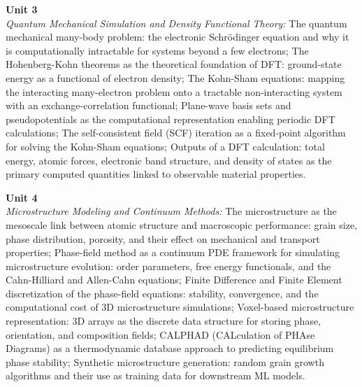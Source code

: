 \vspace{0.3cm}

\noindent\textbf{Unit 3} \\
\textit{Quantum Mechanical Simulation and Density Functional Theory:} The quantum mechanical many-body problem: the electronic Schrödinger equation and why it is computationally intractable for systems beyond a few electrons; The Hohenberg-Kohn theorems as the theoretical foundation of DFT: ground-state energy as a functional of electron density; The Kohn-Sham equations: mapping the interacting many-electron problem onto a tractable non-interacting system with an exchange-correlation functional; Plane-wave basis sets and pseudopotentials as the computational representation enabling periodic DFT calculations; The self-consistent field (SCF) iteration as a fixed-point algorithm for solving the Kohn-Sham equations; Outputs of a DFT calculation: total energy, atomic forces, electronic band structure, and density of states as the primary computed quantities linked to observable material properties.

\vspace{0.3cm}

\noindent\textbf{Unit 4} \\
\textit{Microstructure Modeling and Continuum Methods:} The microstructure as the mesoscale link between atomic structure and macroscopic performance: grain size, phase distribution, porosity, and their effect on mechanical and transport properties; Phase-field method as a continuum PDE framework for simulating microstructure evolution: order parameters, free energy functionals, and the Cahn-Hilliard and Allen-Cahn equations; Finite Difference and Finite Element discretization of the phase-field equations: stability, convergence, and the computational cost of 3D microstructure simulations; Voxel-based microstructure representation: 3D arrays as the discrete data structure for storing phase, orientation, and composition fields; CALPHAD (CALculation of PHAse Diagrams) as a thermodynamic database approach to predicting equilibrium phase stability; Synthetic microstructure generation: random grain growth algorithms and their use as training data for downstream ML models.

\vspace{0.3cm}

